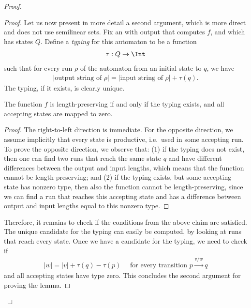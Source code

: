 \begin{proof}
\begin{proof}
        Let us now present in more detail a second argument, which is more direct and does not use semilinear sets.
        Fix an \nfa with output that computes $f$, and which has states $Q$.  Define a \emph{typing} for this automaton to be a function 
        \begin{align*}
        \tau : Q \to \Int
        \end{align*}
        such that for every run $\rho$ of the automaton from an initial state to $q$, we have 
        \begin{align*}
        |\text{output string of $\rho$}| = |\text{input string of $\rho$}| + \tau(q).
        \end{align*}
        The typing, if it exists, is clearly unique.
        \begin{claim}\label{claim:typing-length-preserving}
            The function $f$ is length-preserving if and only if the typing exists, and all accepting states are mapped to zero. 
        \end{claim}
        \begin{proof}
            The right-to-left direction is immediate. For the opposite direction, we assume implicitly that every state is productive, i.e.~used in some accepting run. To prove the opposite direction,  we observe that: (1) if the typing does not exist, then one can find two runs that reach the same state $q$ and have different differences between the output and input lengths, which means that the function cannot be length-preserving; and (2) if the typing exists, but some accepting state has nonzero type, then also the function cannot be length-preserving, since we can find a run that reaches this accepting state and has a difference between output and input lengths equal to this nonzero type.
        \end{proof}
         Therefore, it remains to check if the conditions from the above claim are satisfied. The unique candidate for the typing can easily be computed, by looking at runs that reach every state.  Once we have a candidate for the typing, we need to check if 
        \begin{align*}
         |w|  =  |v| + \tau(q) - \tau(p) \quad \text{ for every transition } p \xrightarrow{ v /w} q
        \end{align*}
 and all accepting states have type zero. This concludes the second argument for  proving the lemma.
        \end{proof}




\end{proof}
